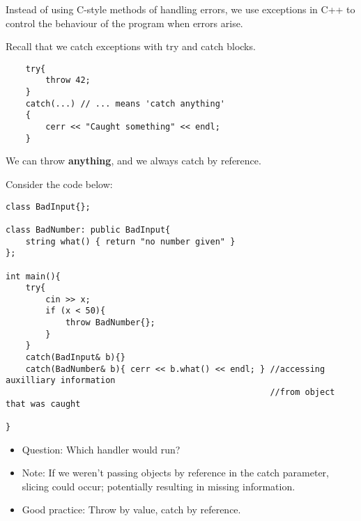 \documentclass{article}
\begin{document}
Instead of using C-style methods of handling errors, we use exceptions in C++ to control the behaviour of the program when errors arise.

Recall that we catch exceptions with try and catch blocks.

\begin{verbatim}
    try{
        throw 42;
    }
    catch(...) // ... means 'catch anything'
    {
        cerr << "Caught something" << endl;
    }
\end{verbatim}
\newpage
We can throw \textbf{anything}, and we always catch by reference.

Consider the code below:

\begin{verbatim}
class BadInput{};

class BadNumber: public BadInput{
    string what() { return "no number given" }
};

int main(){
    try{
        cin >> x;
        if (x < 50){
            throw BadNumber{};
        }
    }
    catch(BadInput& b){}
    catch(BadNumber& b){ cerr << b.what() << endl; } //accessing auxilliary information
                                                     //from object that was caught

}
\end{verbatim}
\begin{itemize}
\item Question: Which handler would run?

\item Note: If we weren't passing objects by reference in the catch parameter, slicing could occur; potentially resulting in missing information.

\item Good practice: Throw by value, catch by reference.

\end{itemize}
\end{document}
